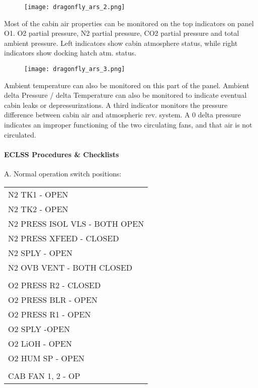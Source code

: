 \documentclass[Orbiter User Manual.tex]{subfiles}
\begin{document}
\begin{figure}[H]
  \centering
  \texttt{[image: dragonfly\_ars\_2.png]}
\end{figure}

\noindent
Most of the cabin air properties can be monitored on the top indicators on panel O1. O2 partial pressure, N2 partial pressure, CO2 partial pressure and total ambient pressure. Left indicators show cabin atmosphere status, while right indicators show docking hatch atm. status.

\begin{figure}[H]
  \centering
  \texttt{[image: dragonfly\_ars\_3.png]}
\end{figure}

\noindent
Ambient temperature can also be monitored on this part of the panel. Ambient delta Pressure / delta Temperature can also be monitored to indicate eventual cabin leaks or depressurizations. A third indicator monitors the pressure difference between cabin air and atmospheric rev. system. A 0 delta pressure indicates an improper functioning of the two circulating fans, and that air is not circulated.

\paragraph{ECLSS Procedures \& Checklists}
A. Normal operation switch positions:

	\begin{longtable}{ p{\textwidth} }
	N2 TK1 - OPEN\\
	N2 TK2 - OPEN\\
	N2 PRESS ISOL VLS - BOTH OPEN\\
	N2 PRESS XFEED - CLOSED\\
	N2 SPLY - OPEN\\
	N2 OVB VENT - BOTH CLOSED\\
	\\
	O2 PRESS R2 - CLOSED\\
	O2 PRESS BLR - OPEN\\
	O2 PRESS R1 - OPEN\\
	O2 SPLY -OPEN\\
	O2 LiOH - OPEN\\
	O2 HUM SP - OPEN\\
	\\
	CAB FAN 1, 2 - OP
	\end{longtable}
\end{document}
